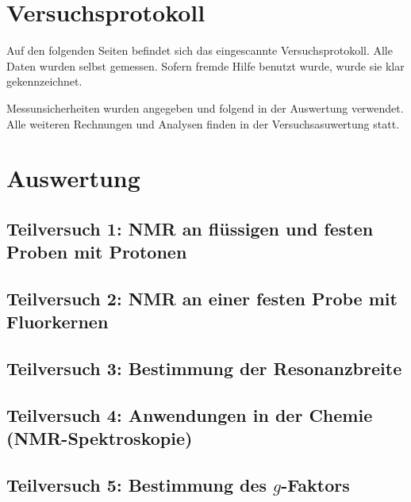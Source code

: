 \documentclass{article}
\begin{document}
\newpage

\iffalse

\section{Versuchsprotokoll}

Auf den folgenden Seiten befindet sich das eingescannte Versuchsprotokoll.
Alle Daten wurden selbst gemessen. Sofern fremde Hilfe benutzt wurde,
wurde sie klar gekennzeichnet.

Messunsicherheiten wurden angegeben und folgend in der Auswertung verwendet.
Alle weiteren Rechnungen und Analysen finden in der Versuchsasuwertung statt.



\newpage

\section{Auswertung}

\subsection{Teilversuch 1: NMR an flüssigen und festen Proben mit Protonen}

\newpage

\subsection{Teilversuch 2: NMR an einer festen Probe mit Fluorkernen}

\newpage

\subsection{Teilversuch 3: Bestimmung der Resonanzbreite}

\newpage

\subsection{Teilversuch 4: Anwendungen in der Chemie (NMR-Spektroskopie)}

\newpage

\subsection{Teilversuch 5: Bestimmung des $g$-Faktors}
\end{document}
